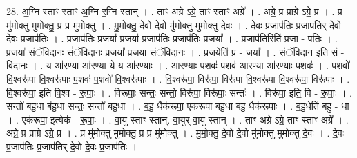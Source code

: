 \documentclass[17pt]{extarticle}
\begin{document}
28. अ॒ग्नि स्ताꣳ स्ताꣳ अ॒ग्नि र॒ग्नि स्तान् । . ताꣳ अग्रे ऽग्रे॒ ताꣳ स्ताꣳ अग्रे᳚ । . अग्रे॒ प्र प्राग्रे ऽग्रे॒ प्र । . प्र मु॑मोक्तु मुमोक्तु॒ प्र प्र मु॑मोक्तु । . मु॒मो॒क्तु॒ दे॒वो दे॒वो मु॑मोक्तु मुमोक्तु दे॒वः । . दे॒वः प्र॒जाप॑तिः प्र॒जाप॑तिर् दे॒वो दे॒वः प्र॒जाप॑तिः । . प्र॒जाप॑तिः प्र॒जया᳚ प्र॒जया᳚ प्र॒जाप॑तिः प्र॒जाप॑तिः प्र॒जया᳚ । . प्र॒जाप॑ति॒रिति॑ प्र॒जा - प॒तिः॒ । . प्र॒जया॑ संॅविदा॒नः सं॑ॅविदा॒नः प्र॒जया᳚ प्र॒जया॑ संॅविदा॒नः । . प्र॒जयेति॑ प्र - जया᳚ । . सं॒ॅवि॒दा॒न इति॑ सं - वि॒दा॒नः । . य आ॑र॒ण्या आ॑र॒ण्या ये य आ॑र॒ण्याः । . आ॒र॒ण्याः प॒शवः॑ प॒शव॑ आर॒ण्या आ॑र॒ण्याः प॒शवः॑ । . प॒शवो॑ वि॒श्वरू॑पा वि॒श्वरू॑पाः प॒शवः॑ प॒शवो॑ वि॒श्वरू॑पाः । . वि॒श्वरू॑पा॒ विरू॑पा॒ विरू॑पा वि॒श्वरू॑पा वि॒श्वरू॑पा॒ विरू॑पाः । . वि॒श्वरू॑पा॒ इति॑ वि॒श्व - रू॒पाः॒ । . विरू॑पाः॒ सन्तः॒ सन्तो॒ विरू॑पा॒ विरू॑पाः॒ सन्तः॑ । . विरू॑पा॒ इति॒ वि - रू॒पाः॒ । . सन्तो॑ बहु॒धा ब॑हु॒धा सन्तः॒ सन्तो॑ बहु॒धा । . ब॒हु॒ धैक॑रूपा॒ एक॑रूपा बहु॒धा ब॑हु॒ धैक॑रूपाः । . ब॒हु॒धेति॑ बहु - धा । . एक॑रूपा॒ इत्येक॑ - रू॒पाः॒ । . वा॒यु स्ताꣳ स्तान्. वा॒युर् वा॒यु स्तान् । . ताꣳ अग्रे ऽग्रे॒ ताꣳ स्ताꣳ अग्रे᳚ । . अग्रे॒ प्र प्राग्रे ऽग्रे॒ प्र । . प्र मु॑मोक्तु मुमोक्तु॒ प्र प्र मु॑मोक्तु । . मु॒मो॒क्तु॒ दे॒वो दे॒वो मु॑मोक्तु मुमोक्तु दे॒वः । . दे॒वः प्र॒जाप॑तिः प्र॒जाप॑तिर् दे॒वो दे॒वः प्र॒जाप॑तिः । \newline
\end{document}
